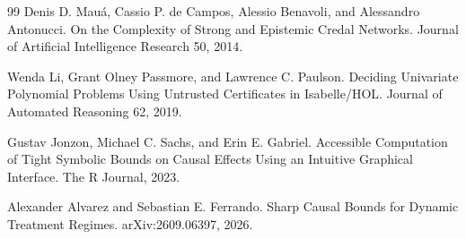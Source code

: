 \documentclass{article}
\begin{document}
\begin{thebibliography}{99}
   Denis D. Mauá, Cassio P. de Campos, Alessio Benavoli, and Alessandro Antonucci. On the Complexity of Strong and Epistemic Credal Networks. Journal of Artificial Intelligence Research 50, 2014.

   Wenda Li, Grant Olney Passmore, and Lawrence C. Paulson. Deciding Univariate Polynomial Problems Using Untrusted Certificates in Isabelle/HOL. Journal of Automated Reasoning 62, 2019.

   Gustav Jonzon, Michael C. Sachs, and Erin E. Gabriel. Accessible Computation of Tight Symbolic Bounds on Causal Effects Using an Intuitive Graphical Interface. The R Journal, 2023.

   Alexander Alvarez and Sebastian E. Ferrando. Sharp Causal Bounds for Dynamic Treatment Regimes. arXiv:2609.06397, 2026.

\end{thebibliography}
\end{document}
